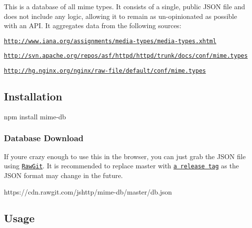 \href{https://npmjs.org/package/mime-db}{\tt } \href{https://npmjs.org/package/mime-db}{\tt } \href{http://nodejs.org/download/}{\tt } \href{https://travis-ci.org/jshttp/mime-db}{\tt } \href{https://coveralls.io/r/jshttp/mime-db?branch=master}{\tt }

This is a database of all mime types. It consists of a single, public J\+S\+ON file and does not include any logic, allowing it to remain as un-\/opinionated as possible with an A\+PI. It aggregates data from the following sources\+:


\begin{DoxyItemize}
\item \href{http://www.iana.org/assignments/media-types/media-types.xhtml}{\tt http\+://www.\+iana.\+org/assignments/media-\/types/media-\/types.\+xhtml}
\item \href{http://svn.apache.org/repos/asf/httpd/httpd/trunk/docs/conf/mime.types}{\tt http\+://svn.\+apache.\+org/repos/asf/httpd/httpd/trunk/docs/conf/mime.\+types}
\item \href{http://hg.nginx.org/nginx/raw-file/default/conf/mime.types}{\tt http\+://hg.\+nginx.\+org/nginx/raw-\/file/default/conf/mime.\+types}
\end{DoxyItemize}

\subsection*{Installation}


\begin{DoxyCode}
npm install mime-db
\end{DoxyCode}


\subsubsection*{Database Download}

If you\textquotesingle{}re crazy enough to use this in the browser, you can just grab the J\+S\+ON file using \href{https://rawgit.com/}{\tt Raw\+Git}. It is recommended to replace {\ttfamily master} with \href{https://github.com/jshttp/mime-db/tags}{\tt a release tag} as the J\+S\+ON format may change in the future.


\begin{DoxyCode}
https://cdn.rawgit.com/jshttp/mime-db/master/db.json
\end{DoxyCode}


\subsection*{Usage}


